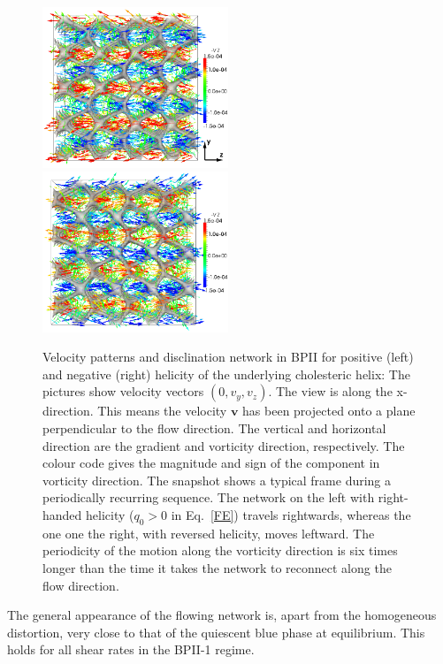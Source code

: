 \documentclass[aps,pre,reprint,superscriptaddress, twocolumn]{revtex4}
\begin{document}
\begin{figure}[htpb]
\includegraphics[width=0.495\textwidth]{v_yz-v_z-160k_run902.png}
\includegraphics[width=0.495\textwidth]{v_yz-v_z-160k_run903.png}
\caption{Velocity patterns and disclination network in BPII for positive (left) and negative (right) helicity of the 
underlying cholesteric helix: The pictures show velocity vectors $(0,v_y,v_z)$.
The view is along the x-direction. This means the velocity ${\mathbf v}$ 
has been projected onto a plane perpendicular to the flow direction. 
The vertical and horizontal direction are the gradient and vorticity direction, respectively.
The colour code gives the magnitude and sign of the component in vorticity direction.
The snapshot shows a typical frame during a periodically recurring sequence.
The network on the left with right-handed helicity ($q_0>0$ in Eq.~\ref{FE}) travels rightwards, whereas the one one the right,
with reversed helicity, moves leftward. 
The periodicity of the motion along the vorticity direction is six times longer than the time 
it takes the network to reconnect along the flow direction.}
\label{bp2-velo}
\end{figure}

The general appearance of the flowing network is, apart from the homogeneous distortion,
very close to that of the quiescent blue phase at equilibrium. This holds for all
shear rates in the BPII-1 regime.
\end{document}

